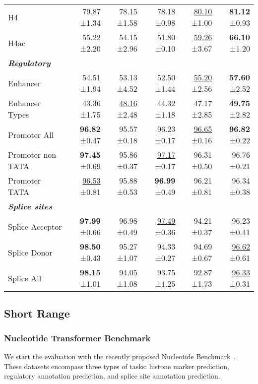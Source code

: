 \begin{table}[t]
{\begin{tabular}{lrrrr>{\columncolor{low}}r}
    H4              & 79.87 \small{±1.34} & 78.15 \small{±1.58} & 78.18 \small{±0.98} & \underline{80.10} \small{±1.00} & \textbf{81.12} \small{±0.93}  \\
    H4ac            & 55.22 \small{±2.20} & 54.15 \small{±2.96} & 51.80 \small{±0.10} & \underline{59.26} \small{±3.67} & \textbf{66.10} \small{±1.20}  \\
    \midrule
    \rowcolor{titlebg} \textit{\textbf{Regulatory}} & & & & & \\
    \midrule
    Enhancer        & 54.51 \small{±1.94} & 53.13 \small{±4.52} & 52.50 \small{±1.44} & \underline{55.20} \small{±2.56} & \textbf{57.60} \small{±2.52}  \\
    Enhancer Types  & 43.36 \small{±1.75} & \underline{48.16} \small{±2.48} & 44.32 \small{±1.18} & 47.17 \small{±2.85} & \textbf{49.75} \small{±2.82}  \\
    Promoter All    & \textbf{96.82} \small{±0.47} & 95.57 \small{±0.18} & 96.23 \small{±0.17} & \underline{96.65} \small{±0.16} & \textbf{96.82} \small{±0.22}  \\
    Promoter non-TATA & \textbf{97.45} \small{±0.69} & 95.86 \small{±0.37} & \underline{97.17} \small{±0.17} & 96.31 \small{±0.50} & 96.76 \small{±0.21}  \\
    Promoter TATA   & \underline{96.53} \small{±0.81} & 95.88 \small{±0.53} & \textbf{96.99} \small{±0.49} & 96.21 \small{±0.81} & 96.34 \small{±0.38}  \\
    \midrule
    \rowcolor{titlebg} \textit{\textbf{Splice sites}} & & & & & \\
    \midrule
    Splice Acceptor & \textbf{97.99} \small{±0.66} & 96.98 \small{±0.49} & \underline{97.49} \small{±0.36} & 94.21 \small{±0.37} & 96.23 \small{±0.41}  \\
    Splice Donor    & \textbf{98.50} \small{±0.43} & 95.27 \small{±1.07} & 94.33 \small{±0.27} & 94.69 \small{±0.67} & \underline{96.62} \small{±0.61}  \\
    Splice All      & \textbf{98.15} \small{±1.01} & 94.05 \small{±1.08} & 93.75 \small{±1.25} & 92.87 \small{±1.73} & \underline{96.33} \small{±0.31}  \\
    \bottomrule
  \end{tabular}
  }
\end{table}
\subsection{Short Range}
\subsubsection{Nucleotide Transformer Benchmark}\label{exp:NT}
We start the evaluation with the recently proposed Nucleotide Benchmark~\citep{dalla2023nucleotide}. These datasets encompass three types of tasks: histone marker prediction, regulatory annotation prediction, and splice site annotation prediction.

